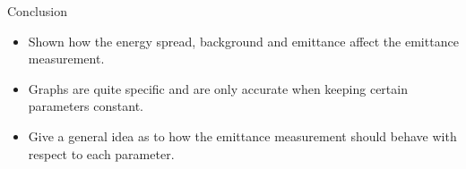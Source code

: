 \documentclass[aspectratio=169]{beamer}
\begin{document}
\begin{frame}{Conclusion}
	\begin{itemize}
		\item Shown how the energy spread, background and emittance affect the
			emittance measurement.
		\item Graphs are quite specific and are only accurate when
			keeping certain parameters constant.
		\item Give a general idea as to how the emittance measurement should
			behave with respect to each parameter.
	\end{itemize}
\end{frame}
\end{document}
